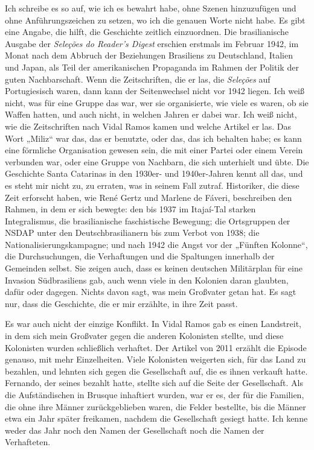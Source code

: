\documentclass[
  ngerman,
  11pt,
  openany]{book}
\begin{document}
Ich schreibe es so auf, wie ich es bewahrt habe, ohne Szenen
hinzuzufügen und ohne Anführungszeichen zu setzen, wo ich die genauen
Worte nicht habe. Es gibt eine Angabe, die hilft, die Geschichte
zeitlich einzuordnen. Die brasilianische Ausgabe der \emph{Seleções do
Reader's Digest} erschien erstmals im Februar 1942, im Monat nach dem
Abbruch der Beziehungen Brasiliens zu Deutschland, Italien und Japan,
als Teil der amerikanischen Propaganda im Rahmen der Politik der guten
Nachbarschaft. Wenn die Zeitschriften, die er las, die \emph{Seleções}
auf Portugiesisch waren, dann kann der Seitenwechsel nicht vor 1942
liegen. Ich weiß nicht, was für eine Gruppe das war, wer sie
organisierte, wie viele es waren, ob sie Waffen hatten, und auch nicht,
in welchen Jahren er dabei war. Ich weiß nicht, wie die Zeitschriften
nach Vidal Ramos kamen und welche Artikel er las. Das Wort „Miliz`` war
das, das er benutzte, oder das, das ich behalten habe; es kann eine
förmliche Organisation gewesen sein, die mit einer Partei oder einem
Verein verbunden war, oder eine Gruppe von Nachbarn, die sich unterhielt
und übte. Die Geschichte Santa Catarinas in den 1930er- und
1940er-Jahren kennt all das, und es steht mir nicht zu, zu erraten, was
in seinem Fall zutraf. Historiker, die diese Zeit erforscht haben, wie
René Gertz und Marlene de Fáveri, beschreiben den Rahmen, in dem er sich
bewegte: den bis 1937 im Itajaí-Tal starken Integralismus, die
brasilianische faschistische Bewegung; die Ortsgruppen der NSDAP unter
den Deutschbrasilianern bis zum Verbot von 1938; die
Nationalisierungskampagne; und nach 1942 die Angst vor der „Fünften
Kolonne``, die Durchsuchungen, die Verhaftungen und die Spaltungen
innerhalb der Gemeinden selbst. Sie zeigen auch, dass es keinen
deutschen Militärplan für eine Invasion Südbrasiliens gab, auch wenn
viele in den Kolonien daran glaubten, dafür oder dagegen. Nichts davon
sagt, was mein Großvater getan hat. Es sagt nur, dass die Geschichte,
die er mir erzählte, in ihre Zeit passt.

Es war auch nicht der einzige Konflikt. In Vidal Ramos gab es einen
Landstreit, in dem sich mein Großvater gegen die anderen Kolonisten
stellte, und diese Kolonisten wurden schließlich verhaftet. Der Artikel
von 2011 erzählt die Episode genauso, mit mehr Einzelheiten. Viele
Kolonisten weigerten sich, für das Land zu bezahlen, und lehnten sich
gegen die Gesellschaft auf, die es ihnen verkauft hatte. Fernando, der
seines bezahlt hatte, stellte sich auf die Seite der Gesellschaft. Als
die Aufständischen in Brusque inhaftiert wurden, war er es, der für die
Familien, die ohne ihre Männer zurückgeblieben waren, die Felder
bestellte, bis die Männer etwa ein Jahr später freikamen, nachdem die
Gesellschaft gesiegt hatte. Ich kenne weder das Jahr noch den Namen der
Gesellschaft noch die Namen der Verhafteten.
\end{document}
